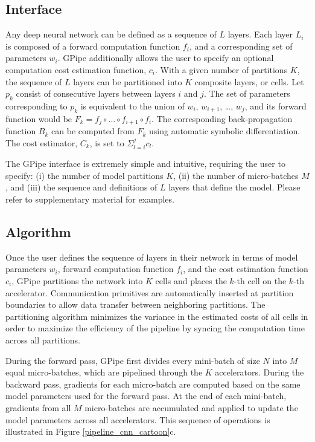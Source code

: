 \documentclass{article}
\def\codename{GPipe}
\begin{document}
\subsection{Interface}
Any deep neural network can be defined as a sequence of $L$ layers. Each layer $L_i$ is composed of a forward computation function $f_i$, and a corresponding set of parameters $w_i$. \codename{} additionally allows the user to specify an optional computation cost estimation function, $c_i$. With a given number of partitions $K$, the sequence of $L$ layers can be partitioned into $K$ composite layers, or cells. Let  $p_k$ consist of consecutive layers between layers $i$ and $j$. The set of parameters corresponding to $p_k$ is equivalent to the union of $w_i$, $w_{i+1}$, \ldots, $w_j$, and its forward function would be $F_k = f_j \circ \ldots \circ f_{i+1} \circ f_i$. The corresponding back-propagation function $B_k$ can be computed from $F_k$ using automatic symbolic differentiation. The cost estimator, $C_k$, is set to $\Sigma_{l=i}^{j}c_l$.

The \codename{} interface is extremely simple and intuitive, requiring the user to specify: (i) the number of model partitions $K$,  (ii) the number of micro-batches $M$, and (iii) the sequence and definitions of $L$ layers that define the model. Please refer to supplementary material for examples.

\subsection{Algorithm}
Once the user defines the sequence of layers in their network in terms of model parameters $w_i$, forward computation function $f_i$, and the cost estimation function $c_i$, \codename{}  partitions the network into $K$ cells and places the $k$-th cell on the $k$-th accelerator. Communication primitives are automatically inserted at partition boundaries to allow data transfer between neighboring partitions. The partitioning algorithm minimizes the variance in the estimated costs of all cells in order to maximize the efficiency of the pipeline by syncing the computation time across all partitions.

During the forward pass, \codename{} first divides every mini-batch of size $N$ into $M$ equal micro-batches, which are pipelined through the $K$ accelerators. During the backward pass, gradients for each micro-batch are computed based on the same model parameters used for the forward pass. At the end of each mini-batch, gradients from all $M$ micro-batches are accumulated and applied to update the model parameters across all accelerators. This sequence of operations is illustrated in Figure \ref{pipeline_cnn_cartoon}c.
\end{document}
